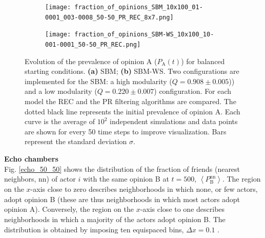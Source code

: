 \documentclass[11 pt , letterpaper , twoside , openright]{book}
\begin{document}
\begin{figure}[H]
  \begin{subfigure}[b]{0.49\textwidth}
    \caption{}
    \texttt{[image: fraction\_of\_opinions\_SBM\_10x100\_01-0001\_003-0008\_50-50\_PR\_REC\_8x7.png]}
    \label{sbm_50-50}
  \end{subfigure}
  \begin{subfigure}[b]{0.49\textwidth}
    \caption{}
    \texttt{[image: fraction\_of\_opinions\_SBM-WS\_10x100\_10-001-0001\_50-50\_PR\_REC.png]}
    \label{sbm-ws_50-50}
  \end{subfigure}
  \captionsetup{format=plain}
  \caption[Evolution of the prevalence of opinion A ($P_{\text{A}}(t)$) for balanced starting conditions.]{Evolution of the prevalence of opinion A ($P_{\text{A}}(t)$) for balanced starting conditions. \textbf{(a)} SBM; \textbf{(b)} SBM-WS. Two configurations are implemented for the SBM: a high modularity ($Q = 0.908 \pm 0.005$)) and a low modularity ($Q = 0.220 \pm 0.007$) configuration. For each model the REC and the PR filtering algorithms are compared. The dotted black line represents the initial prevalence of opinion A. Each curve is the average of $10^2$ independent simulations and data points are shown for every 50 time steps to improve visualization. Bars represent the standard deviation $\sigma$.}
\label{ev_op_50_50}
\end{figure}
\noindent
\textbf{Echo chambers}\\
\newline
Fig. \ref{echo_50_50} shows the distribution of the fraction of friends (nearest neighbors, nn) of actor $i$ with the same opinion B at $t=500$, $\left<P_{\text{B}}^{\text{nn}}\right>$. The region on the $x$-axis close to zero describes neighborhoods in which none, or few actors, adopt opinion B (these are thus neighborhoods in which most actors adopt opinion A). Conversely, the region on the $x$-axis close to one describes neighborhoods in which a majority of the actors adopt opinion B. The distribution is obtained by imposing ten equispaced bins, $\Delta x = 0.1$ \cite{Perra2019}. 
\end{document}

